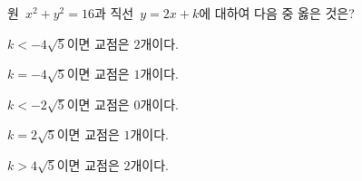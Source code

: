 원~$x^2+y^2=16$과 직선~$y=2x+k$에 대하여 다음 중 옳은 것은?
\begin{choicesv}{\rule[-3ex]{0pt}{8ex}$k<-4\sqrt{5}$이면 교점은 $2$개이다.}{\rule[-3ex]{0pt}{8ex}$k=-4\sqrt{5}$이면 교점은 $1$개이다.}{\rule[-3ex]{0pt}{8ex}$k<-2\sqrt{5}$이면 교점은 $0$개이다.}{\rule[-3ex]{0pt}{8ex}$k=2\sqrt{5}$이면 교점은 $1$개이다.}{\rule[-3ex]{0pt}{8ex}$k>4\sqrt{5}$이면 교점은 $2$개이다.}\end{choicesv}
